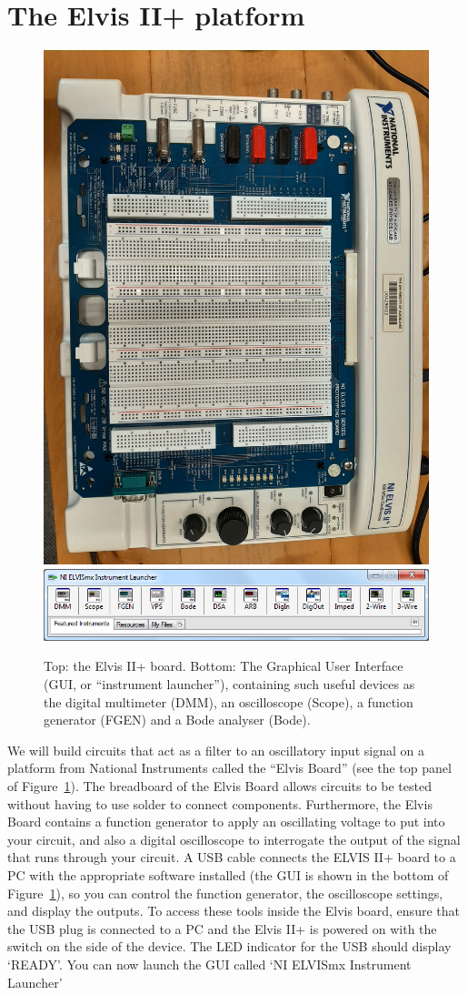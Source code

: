 \documentclass{article}
\begin{document}
\section*{The Elvis II+ platform}
\begin{figure}
  \centering
  \includegraphics[width=0.5\columnwidth]{images/elvisIIplus.jpg}\\
  \includegraphics[width=0.5\columnwidth]{launcher.png}
  \caption{Top: the Elvis II+ board. Bottom: The
    Graphical User Interface (GUI, or ``instrument launcher''), containing
    such useful devices as the digital multimeter (DMM), an
    oscilloscope (Scope), a function generator (FGEN) and a Bode
    analyser (Bode).}
  \label{fig:elvisii}
\end{figure}
We will build circuits that act as a filter to an oscillatory input
signal on a platform from National Instruments called the ``Elvis
Board'' (see the top panel of Figure~\ref{fig:elvisii}). The
breadboard of the Elvis Board allows circuits to be tested without
having to use solder to connect components. Furthermore, the Elvis
Board contains a function generator to apply an oscillating voltage to
put into your circuit, and also a digital oscilloscope to interrogate
the output of the signal that runs through your circuit. A USB cable
connects the ELVIS II+ board to a PC with the appropriate software
installed (the GUI is shown in the bottom of
Figure~\ref{fig:elvisii}), so you can control the function generator,
the oscilloscope settings, and display the outputs.  To access these
tools inside the Elvis board, ensure that the USB plug is connected to
a PC and the Elvis II+ is powered on with the switch on the side of
the device. The LED indicator for the USB should display `READY'. You
can now launch the GUI called `NI ELVISmx Instrument Launcher'
\end{document}
